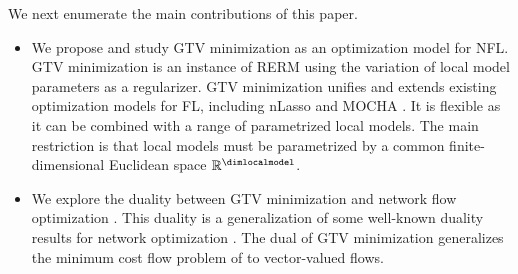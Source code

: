 \documentclass[lettersize,journal]{IEEEtran}
\begin{document}
We next enumerate the main contributions of this paper. 
\begin{itemize} 
\item We propose and study GTV minimization as an optimization model for NFL. GTV minimization 
is an instance of RERM using the variation of local model parameters as a regularizer. GTV minimization 
unifies and extends existing optimization models for FL, including nLasso and MOCHA \cite{Smith2017}. 
It is flexible as it can be combined with a range of parametrized local models. The main 
restriction is that local models must be parametrized by a common finite-dimensional 
Euclidean space $\mathbb{R}^{\dimlocalmodel}$. 

\item We explore the duality between GTV minimization and network flow optimization \cite{BertsekasNetworkOpt}. 
This duality is a generalization of some well-known duality results for network optimization \cite{RockNetworks}. 
The dual of GTV minimization generalizes the minimum cost flow 
problem of \cite{BertsekasNetworkOpt} to vector-valued flows. 


\end{itemize}
\end{document}
